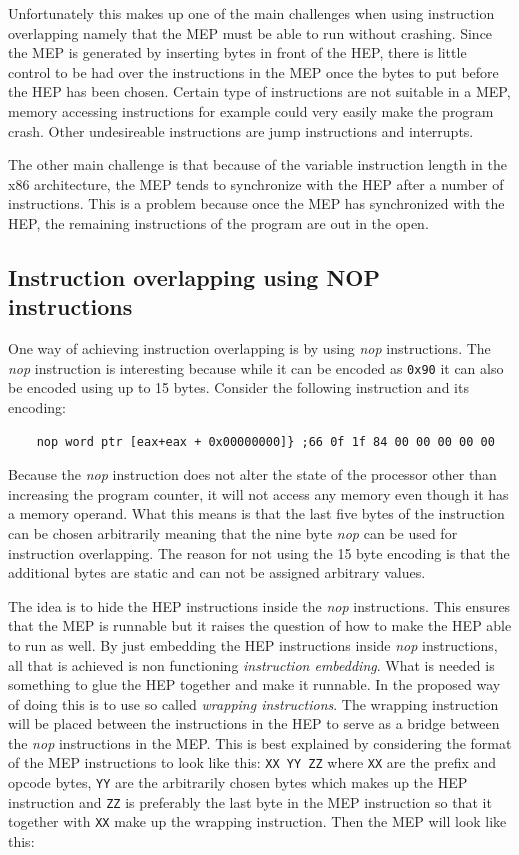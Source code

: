 \documentclass[11pt,twoside]{eitExjobb}
\begin{document}
Unfortunately this makes up one of the main challenges when using instruction overlapping namely that the MEP must be able to run without crashing. Since the MEP is generated by inserting bytes in front of the HEP, there is little control to be had over the instructions in the MEP once the bytes to put before the HEP has been chosen.  Certain type of instructions are not suitable in a MEP, memory accessing instructions for example could very easily make the program crash. Other undesireable instructions are jump instructions  and interrupts.

The other main challenge is that because of the variable instruction length in the x86 architecture, the MEP tends to synchronize with the HEP after a number of instructions. This is a problem because once the MEP has synchronized with the HEP, the remaining instructions of the program are out in the open. 

\subsection{Instruction overlapping using NOP instructions} 
One way of achieving instruction overlapping is by using \emph{nop} instructions\cite{instructionoverlapping}. The \emph{nop} instruction is interesting because while it can be encoded as \texttt{0x90} it can also be encoded using up to 15 bytes. Consider the following instruction and its encoding: 
\begin{verbatim}
    nop word ptr [eax+eax + 0x00000000]} ;66 0f 1f 84 00 00 00 00 00         
\end{verbatim}

\noindent Because the \emph{nop} instruction does not alter the state of the processor other than increasing the program counter, it will not access any memory even though it has a memory operand. What this means is that the last five bytes of the instruction can be chosen arbitrarily meaning that the nine byte \emph{nop} can be used for instruction overlapping. The reason for not using the 15 byte encoding is that the additional bytes are static and can not be assigned arbitrary values.

The idea is to hide the HEP instructions inside the \emph{nop} instructions. This ensures that the MEP is runnable but it raises the question of how to make the HEP able to run as well. By just embedding the HEP instructions inside \emph{nop} instructions, all that is achieved is non functioning \emph{instruction embedding}. What is needed is something to glue the HEP together and make it runnable. In \cite{instructionoverlapping} the proposed way of doing this is to use so called \emph{wrapping instructions}. The wrapping instruction will be placed between the instructions in the HEP to serve as a bridge between the \emph{nop} instructions in the MEP. This is best explained by considering the format of the MEP instructions to look like this: \texttt{XX YY ZZ} where \texttt{XX} are the prefix and opcode bytes, \texttt{YY} are the arbitrarily chosen bytes which makes up the HEP instruction and \texttt{ZZ} is preferably the last byte in the MEP instruction so that it together with \texttt{XX} make up the wrapping instruction. Then the MEP will look like this:
\end{document}
